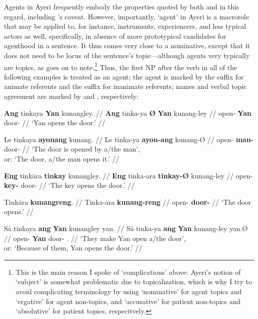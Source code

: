 Agents in Ayeri frequently embody the properties quoted by both 
\citeauthor{fillmore1968} and \citeauthor{payne1997} in this regard, including 
\citeauthor{fillmore1968}'s caveat. However, importantly, `agent' in Ayeri is a 
macrorole that may be applied to, for instance, instruments, experiencers, and 
less typical actors as well, specifically, in absence of more prototypical 
candidates for agenthood in a sentence. It thus comes very close to a 
nominative, except that it does not need to be locus of the sentence's 
topic---although agents very typically are topics, as 
\citet[151]{payne1997} goes on to note.\footnote{This is the main reason I spoke 
of `complications' above: Ayeri's notion of `subject' is somewhat problematic 
due to topicalization, which is why I try to avoid complicating terminology by 
using `nominative' for agent topics and `ergative' for agent non-topics, and 
`accusative' for patient non-topics and `absolutive' for patient topics, 
respecitvely.} Thus, the first NP after the verb in all of the following 
examples is treated as an agent; the agent is marked by the suffix 
 for animate referents and the suffix  for 
inanimate referents; names and verbal topic agreement are marked by 
 and , respectively:

\pex
\a\begingl
	\gla \textbf{Ang} tinkaya \textbf{{}} \textbf{Yan} kunangley. //
	\glb \textbf{Ang} tinka-ya \textbf{Ø} \textbf{Yan} kunang-ley //
	\glc \textbf{\AgtT{}} open-\TsgM{} \textbf{\Top{}} \textbf{Yan} 
		door-\PargI{} //
	\glft `Yan opens the door.' //
\endgl

\a\begingl
	\gla Le tinkaya \textbf{ayonang} kunang. //
	\glb Le tinka-ya \textbf{ayon-ang} kunang-Ø //
	\glc \PatT{} open-\TsgM{} \textbf{man-\Aarg{}} door-\Top{} //
	\glft `The door is opened by a/the man',\\
		or: `The door, a/the man opens it.' //
\endgl

\a\begingl
	\gla \textbf{Eng} tinkāra \textbf{tinkay} kunangley. //
	\glb \textbf{Eng} tinka-ara \textbf{tinkay-Ø} kunang-ley //
	\glc \textbf{\AgtTI{}} open-\TsgI{} \textbf{key-\Top{}} door-\PargI{} //
	\glft `The key opens the door.' //
\endgl

\a\begingl
	\gla Tinkāra \textbf{kunangreng}. //
	\glb Tinka-ara \textbf{kunang-reng} //
	\glc open-\TsgI{} \textbf{door-\AargI{}} //
	\glft `The door opens.' //
\endgl

\a\begingl
	\gla Sā tinkaya \textbf{ang} \textbf{Yan} kunangley yan. //
	\glb Sā tinka-ya \textbf{ang} \textbf{Yan} kunang-ley yan.Ø //
	\glc \CauT{} open-\TsgM{} \textbf{\Aarg{}} \textbf{Yan} door-\PargI{} 
		\TsgM{}.\Top{} //
	\glft `They make Yan open a/the door',\\
		or: `Because of them, Yan opens the door.' //
\endgl

